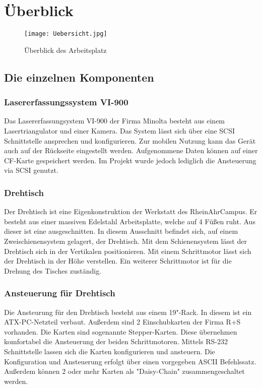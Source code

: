 \chapter{Überblick}
\label{cha:Überblick}
\begin{figure}[htb]
\centering
\texttt{[image: Uebersicht.jpg]}
\caption{Überblick des Arbeitsplatz}
\label{fig:Übersicht}
\end{figure}

\section{Die einzelnen Komponenten}
\label{sec:Komponenten}

\subsection{Lasererfassungssystem VI-900}
Das Lasererfassungsystem VI-900 der Firma Minolta besteht aus einem Lasertriangulator und einer Kamera. Das System lässt sich über eine SCSI Schnittstelle ansprechen und konfigurieren. Zur mobilen Nutzung kann das Gerät   auch auf der Rückseite eingestellt werden. Aufgenommene Daten können auf einer CF-Karte gespeichert werden. Im Projekt wurde jedoch lediglich die Ansteuerung via SCSI genutzt.

\subsection{Drehtisch}
Der Drehtisch ist eine Eigenkonstruktion der Werkstatt des RheinAhrCampus. Er besteht aus einer massiven Edelstahl Arbeitsplatte, welche auf 4 Füßen ruht. Aus dieser ist eine  ausgeschnitten. In diesem Ausschnitt befindet sich, auf einem Zweischienensystem gelagert, der Drehtisch. Mit dem Schienensystem lässt der Drehtisch sich in der Vertikalen positionieren. Mit einem Schrittmotor lässt sich der Drehtisch in der Höhe verstellen. Ein weiterer Schrittmotor ist für die Drehung des Tisches zuständig.   
\subsection{Ansteuerung für Drehtisch}
Die Ansteurung für den Drehtisch besteht aus einem 19"-Rack. In diesem ist ein ATX-PC-Netzteil verbaut. Außerdem sind 2 Einschubkarten der Firma R+S vorhanden. Die Karten sind sogenannte Stepper-Karten. Diese übernehmen komfortabel die Ansteuerung der beiden Schrittmotoren. Mittels RS-232 Schnittstelle lassen sich die Karten konfigurieren und ansteuern. Die Konfiguration und Ansteuerung erfolgt über einen vorgegeben ASCII Befehlssatz. Außerdem können 2 oder mehr Karten als "Daisy-Chain" zusammengeschaltet werden. 
